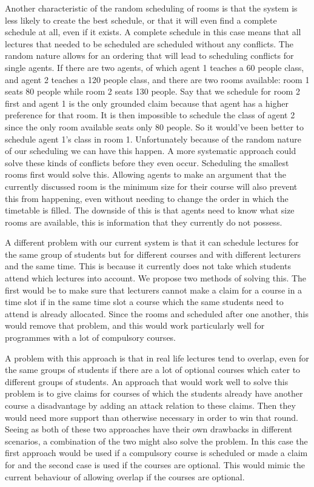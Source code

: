 Another characteristic of the random scheduling of rooms is that the system is
less likely to create the best schedule, or that it will even find a complete
schedule at all, even if it exists. A complete schedule in this case means that
all lectures that needed to be scheduled are scheduled without any conflicts.
The random nature allows for an ordering that will lead to scheduling conflicts
for single agents. If there are two agents, of which agent 1 teaches a 60 people
class, and agent 2 teaches a 120 people class, and there are two rooms
available: room 1 seats 80 people while room 2 seats 130 people. Say that we
schedule for room 2 first and agent 1 is the only grounded claim because that
agent has a higher preference for that room. It is then impossible to schedule
the class of agent 2 since the only room available seats only 80 people. So it
would've been better to schedule agent 1's class in room 1. Unfortunately
because of the random nature of our scheduling we can have this happen. A more
systematic approach could solve these kinds of conflicts before they even occur.
Scheduling the smallest rooms first would solve this. Allowing agents to make
an argument that the currently discussed room is the minimum size for their
course will also prevent this from happening, even without needing to change the
order in which the timetable is filled. The downside of this is that agents need
to know what size rooms are available, this is information that they currently
do not possess.

A different problem with our current system is that it can schedule lectures
for the same group of students but for different courses and with
different lecturers and the same time. This is because it currently does
not take which students attend which lectures into account. We propose two
methods of solving this. The first would be to make sure that lecturers
cannot make a claim for a course in a time slot if in the same time slot a
course which the same students need to attend is already allocated. Since
the rooms and scheduled after one another, this would remove that problem,
and this would work particularly well for programmes with a lot of
compulsory courses. 

A problem with this approach is that in real life lectures tend to overlap,
even for the same groups of students if there are a lot of optional courses
which cater to different groups of students. An approach that would work
well to solve this problem is to give claims for courses of which the
students already have another course a disadvantage by adding an attack
relation to these claims. Then they would need more support than otherwise
necessary in order to win that round. Seeing as both of these two
approaches have their own drawbacks in different scenarios, a combination
of the two might also solve the problem.  In this case the first approach
would be used if a compulsory course is scheduled or made a claim for and
the second case is used if the courses are optional. This would mimic the
current behaviour of allowing overlap if the courses are optional.

